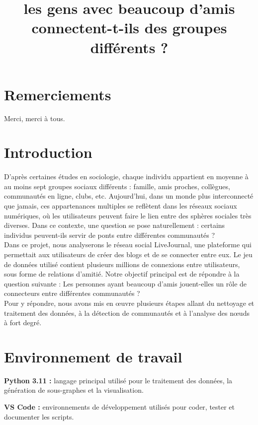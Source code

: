 \documentclass[a4paper, 12pt, twoside]{article}
\title{les gens avec beaucoup d’amis connectent-t-ils des groupes différents ?}
\begin{document}
\pagedegarde
\section*{Remerciements}
Merci, merci à tous.
\newpage

\tableofcontents
\newpage

\section{Introduction}

\paragraph{}D’après certaines études en sociologie, chaque individu appartient en moyenne à au moins sept groupes sociaux différents : famille, amis proches, collègues, communautés en ligne, clubs, etc. Aujourd’hui, dans un monde plus interconnecté que jamais, ces appartenances multiples se reflètent dans les réseaux sociaux numériques, où les utilisateurs peuvent faire le lien entre des sphères sociales très diverses. Dans ce contexte, une question se pose naturellement : certains individus peuvent-ils servir de ponts entre différentes communautés ? \\

Dans ce projet, nous analyserons le réseau social LiveJournal, une plateforme qui permettait aux utilisateurs de créer des blogs et de se connecter entre eux. Le jeu de données utilisé contient plusieurs millions de connexions entre utilisateurs, sous forme de relations d’amitié.
Notre objectif principal est de répondre à la question suivante :
Les personnes ayant beaucoup d'amis jouent-elles un rôle de connecteurs entre différentes communautés ?\\

Pour y répondre, nous avons mis en œuvre plusieurs étapes allant du nettoyage et traitement des données, à la détection de communautés et à l’analyse des nœuds à fort degré. 





\section{Environnement de travail}
\textbf{Python 3.11 :} langage principal utilisé pour le traitement des données, la génération de sous-graphes et la visualisation.

\textbf{ VS Code :} environnements de développement utilisés pour coder, tester et documenter les scripts.
\end{document}
